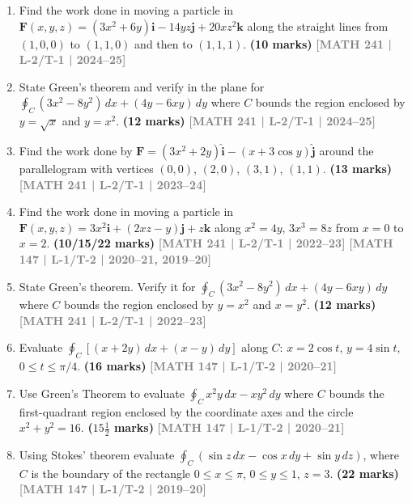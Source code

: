 \documentclass[12pt,a3paper]{article}
\newcommand{\yr}[1]{\hfill\textcolor{gray}{\small\textbf{[#1]}}}
\newcommand{\mk}[1]{\textcolor{orange!70!black}{\small\textbf{(#1 marks)}}}
\begin{document}
\begin{enumerate}
    
\item Find the work done in moving a particle in $\mathbf{F}(x,y,z)=(3x^{2}+6y)\mathbf{i}-14yz\mathbf{j}+20xz^{2}\mathbf{k}$ along the straight lines from $(1,0,0)$ to $(1,1,0)$ and then to $(1,1,1)$.
\mk{10} \yr{MATH 241 | L-2/T-1 | 2024--25}


\item State Green's theorem and verify in the plane for $\displaystyle\oint_{C}(3x^{2}-8y^{2})\,dx+(4y-6xy)\,dy$ where $C$ bounds the region enclosed by $y=\sqrt{x}$ and $y=x^{2}$.
\mk{12} \yr{MATH 241 | L-2/T-1 | 2024--25}


\item Find the work done by $\mathbf{F}=(3x^{2}+2y)\hat{\mathbf{i}}-(x+3\cos y)\hat{\mathbf{j}}$ around the parallelogram with vertices $(0,0)$, $(2,0)$, $(3,1)$, $(1,1)$.
\mk{13} \yr{MATH 241 | L-2/T-1 | 2023--24}


\item Find the work done in moving a particle in $\mathbf{F}(x,y,z)=3x^{2}\mathbf{i}+(2xz-y)\mathbf{j}+z\mathbf{k}$ along $x^{2}=4y$, $3x^{3}=8z$ from $x=0$ to $x=2$.
\mk{10/15/22} \yr{MATH 241 | L-2/T-1 | 2022--23} \yr{MATH 147 | L-1/T-2 | 2020--21, 2019--20}



\item State Green's theorem. Verify it for $\displaystyle\oint_{C}(3x^{2}-8y^{2})\,dx+(4y-6xy)\,dy$ where $C$ bounds the region enclosed by $y=x^{2}$ and $x=y^{2}$.
\mk{12} \yr{MATH 241 | L-2/T-1 | 2022--23}


\item Evaluate $\displaystyle\oint_{C}[(x+2y)\,dx+(x-y)\,dy]$ along $C$: $x=2\cos t$, $y=4\sin t$, $0\le t\le\pi/4$.
\mk{16} \yr{MATH 147 | L-1/T-2 | 2020--21}


\item Use Green's Theorem to evaluate $\displaystyle\oint_{C}x^{2}y\,dx-xy^{2}\,dy$ where $C$ bounds the first-quadrant region enclosed by the coordinate axes and the circle $x^{2}+y^{2}=16$.
\mk{$15\tfrac{1}{2}$} \yr{MATH 147 | L-1/T-2 | 2020--21}



\item Using Stokes' theorem evaluate $\oint_{C}(\sin z\,dx - \cos x\,dy + \sin y\,dz)$, where $C$ is the boundary of the rectangle $0\le x\le\pi$, $0\le y\le 1$, $z=3$.
\mk{22} \yr{MATH 147 | L-1/T-2 | 2019--20}



\end{enumerate}
\end{document}

